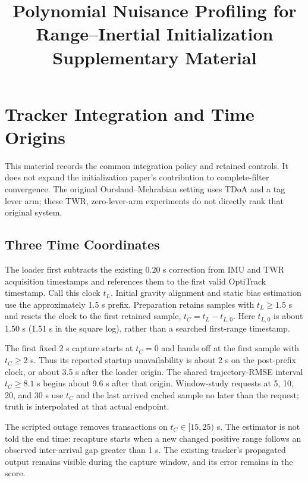 \documentclass[conference,letterpaper,10pt]{IEEEtran}
\title{Polynomial Nuisance Profiling for Range--Inertial Initialization\\Supplementary Material}
\author{\IEEEauthorblockN{Anonymous Authors}}
\begin{document}
\maketitle

\section{Tracker Integration and Time Origins}
This material records the common integration policy and retained controls. It does not expand the initialization paper's contribution to complete-filter convergence. The original Oursland--Mehrabian setting uses TDoA and a tag lever arm\cite{oursland2024}; these TWR, zero-lever-arm experiments do not directly rank that original system.

\subsection{Three Time Coordinates}
The loader first subtracts the existing $0.20$ s correction from IMU and TWR acquisition timestamps and references them to the first valid OptiTrack timestamp. Call this clock $t_L$. Initial gravity alignment and static bias estimation use the approximately 1.5 s prefix. Preparation retains samples with $t_L\ge1.5$ s and resets the clock to the first retained sample, $t_C=t_L-t_{L,0}$. Here $t_{L,0}$ is about 1.50 s (1.51 s in the square log), rather than a searched first-range timestamp.

The first fixed 2 s capture starts at $t_C=0$ and hands off at the first sample with $t_C\ge2$ s. Thus its reported startup unavailability is about 2 s on the post-prefix clock, or about 3.5 s after the loader origin. The shared trajectory-RMSE interval $t_C\ge8.1$ s begins about 9.6 s after that origin. Window-study requests at 5, 10, 20, and 30 s use $t_C$ and the last arrived cached sample no later than the request; truth is interpolated at that actual endpoint.

The scripted outage removes transactions on $t_C\in[15,25)$ s. The estimator is not told the end time: recapture starts when a new changed positive range follows an observed inter-arrival gap greater than 1 s. The existing tracker's propagated output remains visible during the capture window, and its error remains in the score.
\end{document}
